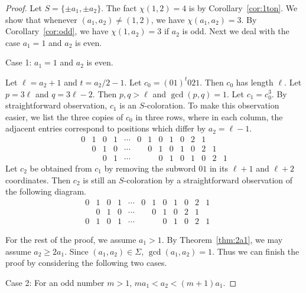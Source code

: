 \documentclass[10pt,a4paper]{amsart}
\begin{document}
\begin{proof} Let $S=\{\pm a_1, \pm a_2\}$. The fact $\chi(1,2)=4$ is by Corollary~\ref{cor:1ton}. We show that whenever $(a_1, a_2)\neq (1,2)$, we have $\chi(a_1, a_2)=3$. By Corollary~\ref{cor:odd}, we have $\chi(1, a_2)=3$ if $a_2$ is odd. Next we deal with the case $a_1=1$ and $a_2$ is even.

Case 1: $a_1=1$ and $a_2$ is even. 

Let $\ell=a_2+1$ and $t=a_2/2-1$. Let $c_0=(01)^t021$. Then $c_0$ has length $\ell$. Let $p=3\ell$ and $q=3\ell-2$. Then $p, q>\ell$ and $\gcd(p,q)=1$. Let $c_1=c_0^3$. By straightforward observation, $c_1$ is an $S$-coloration. To make this observation easier, we list the three copies of $c_0$ in three rows, where in each column, the adjacent entries correspond to positions which differ by $a_2=\ell-1$.
$$ \begin{array}{rccccccccccccl}
0 & 1 & 0 & 1 & \cdots & 0 & 1 & 0 & 1 & 0 & 2 & 1 &  & \\
   & 0 & 1 & 0 & \cdots &    & 0 & 1 & 0 & 1 & 0 & 2 & 1 & \\
   &    & 0 & 1 & \cdots &    &    & 0 & 1 & 0 & 1 & 0 & 2 & 1
   \end{array}
   $$
Let $c_2$ be obtained from $c_1$ by removing the subword $01$ in its $\ell+1$ and $\ell+2$ coordinates. Then $c_2$ is still an $S$-coloration by a straightforward observation of the following diagram.
$$ \begin{array}{rccccccccccccl}
0 & 1 & 0 & 1 & \cdots & 0 & 1 & 0 & 1 & 0 & 2 & 1 &  & \\
   & 0 & 1 & 0 & \cdots &    & 0 & 1 & 0 & 2 & 1 &  &  & \\
0   &  1  & 0 & 1 & \cdots &    &    & 0 & 1 & 0 & 2 & 1 &  &
   \end{array}
   $$

For the rest of the proof, we assume $a_1>1$. By Theorem~\ref{thm:2a1}, we may assume $a_2\geq 2a_1$. Since $(a_1, a_2)\in\Sigma$, $\gcd(a_1, a_2)=1$. Thus we can finish the proof by considering the following two cases. 

Case 2: For an odd number $m>1$, $ma_1<a_2<(m+1)a_1$.


\end{proof}
\end{document}
